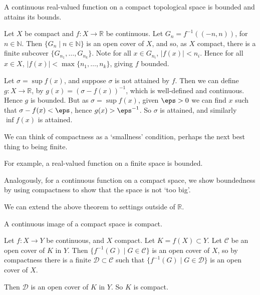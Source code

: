 \documentclass[12pt]{article}
\begin{document}
\begin{theorem}
	A continuous real-valued function on a compact topological space is bounded and attains its bounds.
\end{theorem}

\begin{proofbox}
	Let $X$ be compact and $f : X \to \mathbb{R}$ be continuous. Let $G_n = f^{-1}((-n, n))$, for $n \in \mathbb{N}$. Then $\{G_n \mid n \in \mathbb{N}\}$ is an open cover of $X$, and so, as $X$ compact, there is a finite subcover $\{G_{n_1}, \ldots, G_{n_k}\}$. Note for all $x \in G_{n_i}$, $|f(x)| < n_i$. Hence for all $x \in X$, $|f(x)| < \max \{n_1, \ldots, n_k\}$, giving $f$ bounded.

	Let $\sigma = \sup f(x)$, and suppose $\sigma$ is not attained by $f$. Then we can define $g : X \to \mathbb{R}$, by $g(x) = (\sigma - f(x))^{-1}$, which is well-defined and continuous. Hence $g$ is bounded. But as $\sigma = \sup f(x)$, given $\eps > 0$ we can find $x$ such that $\sigma - f(x) < \eps$, hence $g(x) > \eps^{-1}$. So $\sigma$ is attained, and similarly $\inf f(x)$ is attained.
\end{proofbox}

\begin{remark}
	We can think of compactness as a `smallness' condition, perhaps the next best thing to being finite.

	For example, a real-valued function on a finite space is bounded.

	Analogously, for a continuous function on a compact space, we show boundedness by using compactness to show that the space is not `too big'.
\end{remark}

We can extend the above theorem to settings outside of $\mathbb{R}$.

\begin{theorem}
	A continuous image of a compact space is compact.
\end{theorem}

\begin{proofbox}
	Let $f : X \to Y$ be continuous, and $X$ compact. Let $K = f(X) \subset Y$. Let $\mathcal{C}$ be an open cover of $K$ in $Y$. Then $\{f^{-1}(G) \mid G \in \mathcal{C}\}$ is an open cover of $X$, so by compactness there is a finite $\mathcal{D} \subset \mathcal{C}$ such that $\{f^{-1}(G) \mid G \in \mathcal{D}\}$ is an open cover of $X$.

	Then $\mathcal{D}$ is an open cover of $K$ in $Y$. So $K$ is compact.
\end{proofbox}
\end{document}
